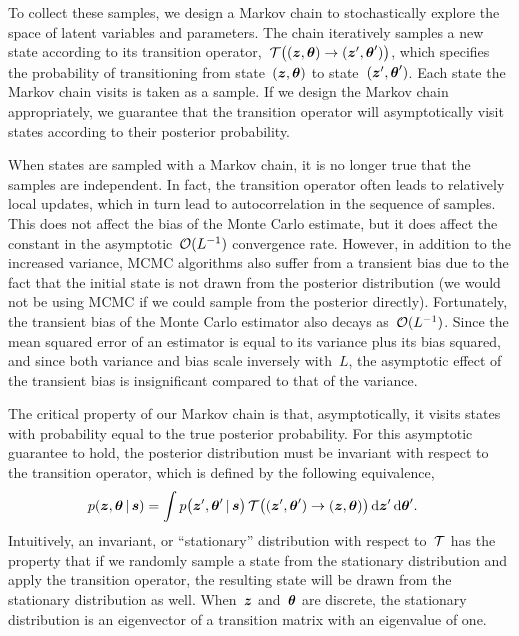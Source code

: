 To collect these samples, we design a Markov chain to stochastically
explore the space of latent variables and parameters.  
The chain iteratively samples a new state according to its transition
operator,~${\mathcal{T} \big((\boldsymbol{z}, \boldsymbol{\theta}) \to (\boldsymbol{z}', \boldsymbol{\theta}') \big)}$,
which specifies the probability of transitioning from state~${(\boldsymbol{z},
  \boldsymbol{\theta})}$ to state~${(\boldsymbol{z}', \boldsymbol{\theta}')}$.  Each state the Markov
chain visits is taken as a sample. If we design the Markov chain
appropriately, we guarantee that the transition operator will
asymptotically visit states according to their posterior probability.

When states are sampled with a Markov chain, it is no longer true that
the samples are independent. In fact, the transition operator often
leads to relatively local updates, which in turn lead to
autocorrelation in the sequence of samples. This does not affect the
bias of the Monte Carlo estimate, but it does affect the constant in the
asymptotic~$\mathcal{O}(L^{-1})$ convergence rate. However, in addition to
the increased variance, MCMC algorithms also suffer from a transient
bias due to the fact that the initial state is not drawn from the
posterior distribution (we would not be using MCMC if we could sample
from the posterior directly). Fortunately, the transient bias of the
Monte Carlo estimator also decays as~$\mathcal{O}(L^{-1})$. Since the mean
squared error of an estimator is equal to its variance plus its bias
squared, and since both variance and bias scale inversely with~$L$,
the asymptotic effect of the transient bias is insignificant compared
to that of the variance.

The critical property of our Markov chain is that, asymptotically, it
visits states with probability equal to the true posterior
probability.  For this asymptotic guarantee to hold, the posterior
distribution must be invariant with respect to the transition
operator, which is defined by the following equivalence,
\begin{align}
  \label{eq:invariance}
  p(\boldsymbol{z}, \boldsymbol{\theta} \,|\, \boldsymbol{s}) 
  &= \int  p \big(\boldsymbol{z}', \boldsymbol{\theta}' \,|\, \boldsymbol{s} \big) \,
    \mathcal{T} \big((\boldsymbol{z}', \boldsymbol{\theta}') \to (\boldsymbol{z}, \boldsymbol{\theta}) \big) \, 
    \mathrm{d}\boldsymbol{z}' \, \mathrm{d}\boldsymbol{\theta}'. 
\end{align}
Intuitively, an invariant, or ``stationary'' distribution with
respect to~$\mathcal{T}$ has the property that if we randomly sample a state
from the stationary distribution and apply the transition operator,
the resulting state will be drawn from the stationary distribution as
well. When~$\boldsymbol{z}$ and~$\boldsymbol{\theta}$ are discrete, the stationary
distribution is an eigenvector of a transition matrix with an eigenvalue
of one.

